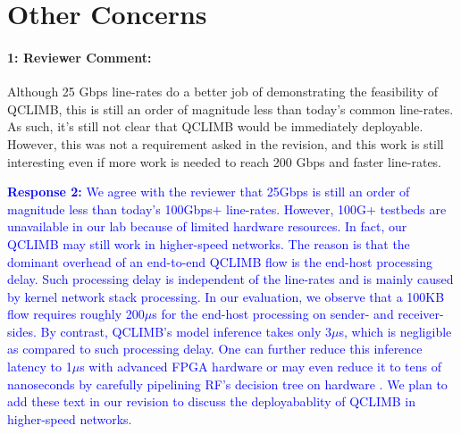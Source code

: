 \documentclass[12pt,one-column]{article}
\begin{document}
\section{Other Concerns}
{\it \paragraph{1: Reviewer Comment:} Although 25 Gbps line-rates do a better job of demonstrating the feasibility of QCLIMB, this is still an order of magnitude less than today's common line-rates. As such, it's still not clear that QCLIMB would be immediately deployable. However, this was not a requirement asked in the revision, and this work is still interesting even if more work is needed to reach 200 Gbps and faster line-rates. }


\noindent\textcolor{blue}{\textbf{Response 2:} We agree with the reviewer that 25Gbps is still an order of magnitude less than today's 100Gbps$+$ line-rates. However, 100G+ testbeds are unavailable in our lab because of limited hardware resources. 
	In fact, our QCLIMB may still work in higher-speed networks.
	The reason is that the dominant overhead of an end-to-end QCLIMB flow is the end-host processing delay.
	Such processing delay is independent of the line-rates and is mainly caused by kernel network stack processing.
	In our evaluation, we observe that a 100KB flow requires roughly 200$\mu$s for the end-host processing on sender- and receiver-sides.
	By contrast, QCLIMB's model inference takes only 3$\mu$s, which is negligible as compared to such processing delay.
	One can further reduce this inference latency to 1$\mu$s with advanced FPGA hardware \cite{dhukic2019advance} or may even reduce it to tens of nanoseconds by carefully pipelining RF's decision tree on hardware \cite{Rashelbach2020a}. 
	We plan to add these text in our revision to discuss the deployabablity of QCLIMB in higher-speed networks.
}





\begin{spacing}{-1.0}

\vspace{-0.1in}

\end{spacing}
\end{document}
